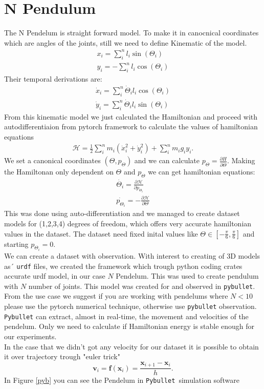 	


 
 \section{N Pendulum}
 The N Pendelum is straight forward model.
 To make it in canocnical coordinates which are angles of the joints, still we need to define Kinematic of the model.
 \begin{eqnarray}
 	x_i = \sum_i^n l_i\sin(\Theta_i)\\
 	y_i = -\sum_i^n l_i\cos(\Theta_i)
 \end{eqnarray}
Their temporal derivations are:
\begin{eqnarray}
\dot{x}_i = \sum_i^n \dot{\Theta}_i l_i\cos(\Theta_i)\\
	\dot{y}_i = \sum_i^n \dot{\Theta}_i l_i\sin(\Theta_i)
 \end{eqnarray}
From this kinematic model we just calculated the Hamiltonian and proceed with autodifferentiaion from pytorch framework to calculate the values of hamiltonian equations
\begin{eqnarray}
	\mathcal{H} = \frac{1}{2}\sum_i^n m_i (\dot{x}_i^2 + \dot{y}_i^2) + \sum_i^n m_ig_iy_i. 
\end{eqnarray}
We set a canonical coordinates $(\Theta, p_{\Theta})$ and we can calculate $p_{\Theta} = \frac{\partial H}{\partial \dot{\Theta}}$.
Making the Hamiltonan only dependent on $\Theta$ and $p_{\Theta}$ we can get hamiltonian equations:
\begin{eqnarray}
	\dot{\Theta_i} = \frac{\partial \mathcal{H}}{\partial p_{\Theta_i}}\\
	\dot{p_{\Theta_i}} = -\frac{\partial \mathcal{H}}{\partial \Theta}
\end{eqnarray}
This was done using auto-differentiation and we managed to create dataset models for (1,2,3,4) degrees of freedom, which offers very accurate hamiltonian values in the dataset. 
The dataset need fixed inital values like  $\Theta \in [-\frac{\pi}{6},\frac{\pi}{6}]$ and starting $p_{\Theta_i} = 0 $.\\
We can create a dataset with observation. With interest to creating of 3D models as´ \texttt{urdf} files, we created the framework which trough python coding crates accurate urdf model, in our case $N$ Pendelum. This was used to create pendulum with $N$  number of joints. This model was created for and  observed in \texttt{pybullet}\cite{pybullet}. From the use case we suggest if you are working with pendelums where $N<10$ please use the pytorch numerical technique, otherwise use \texttt{pybullet} observation. \texttt{Pybullet} can extract, almost in real-time, the movement and velocities of the pendelum. Only we need to calculate if Hamiltonian energy is stable enough for our experiments.\\ In the case that we didn't got any velocity for our dataset it is possible to obtain it over trajectory trough "euler trick"
\begin{equation}
	\mathbf{v}_i=\mathbf{f}(\mathbf{x}_i) = \frac{\mathbf{x}_{i+1}-\mathbf{x}_i}{h}.
\end{equation}
In Figure \ref{pyb} you can see the Pendelum in \texttt{Pybullet }simulation software

